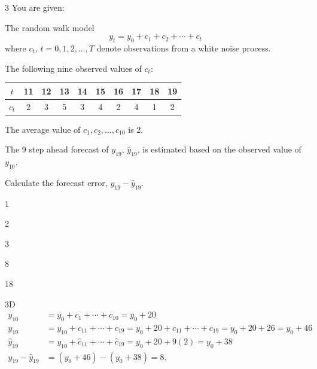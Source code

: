 \begin{question}{3}
You are given:
\begin{given}
\item The random walk model
\[ y_t = y_0 + c_1 + c_2 + \cdots + c_t \]
where $c_t,\, t = 0,1,2,\ldots,T$ denote observations from a white noise process.
\item The following nine observed values of $c_t$:
\begin{center}
\begin{tabular}{|c|c|c|c|c|c|c|c|c|c|}
\hline
$t$   & 11 & 12 & 13 & 14 & 15 & 16 & 17 & 18 & 19 \\ \hline
$c_t$ & 2  & 3  & 5  & 3  & 4  & 2  & 4  & 1  & 2  \\ \hline
\end{tabular}
\end{center}
\item The average value of $c_1, c_2, \ldots, c_{10}$ is 2.
\item The 9 step ahead forecast of $y_{19}$, $\hat{y}_{19}$, is estimated based on the observed value of $y_{10}$.
\end{given}

Calculate the forecast error, $y_{19} - \hat{y}_{19}$.

\begin{choices}
\item 1
\item 2
\item 3
\item 8
\item 18
\end{choices}
\end{question}
\begin{solution}{3}{D}
\begin{align*}
y_{10} &= y_0 + c_1 + \cdots + c_{10} = y_0 + 20 \\
y_{19} &= y_{10} + c_{11} + \cdots + c_{19} = y_0 + 20 + c_{11} + \cdots + c_{19} = y_0 + 20 + 26 = y_0 + 46 \\
\hat{y}_{19} &= y_{10} + \hat{c}_{11} + \cdots + \hat{c}_{19} = y_0 + 20 + 9(2) = y_0 + 38 \\
y_{19} - \hat{y}_{19} &= (y_0 + 46) - (y_0 + 38) = 8.
\end{align*}
\end{solution}

